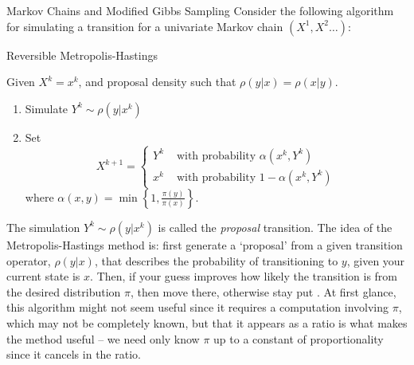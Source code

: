 \begin{chapter}{Markov Chains and Modified Gibbs Sampling}
Consider the following algorithm for simulating a transition for a univariate Markov chain $(X^1,X^2\dots)$:
\begin{algorithm}[H]
\caption{Reversible Metropolis-Hastings} \label{alg:metropolis}
Given $X^k = x^{k}$, and proposal density such that $\rho(y|x) = \rho(x|y)$.
\begin{enumerate}[1.]
  \item Simulate $Y^k \sim \rho(y|x^k)$
  \item Set
  \begin{equation*}
    X^{k+1} = \begin{cases}
      Y^k &\text{ with probability } \alpha(x^{k},Y^k) \\
      x^k &\text{ with probability } 1-\alpha(x^{k},Y^k)
    \end{cases} 
  \end{equation*}
  where $\displaystyle{\alpha(x,y) = \min\left\{1,\frac{\pi(y)}{\pi(x)}\right\}.}$ 
\end{enumerate}
\end{algorithm} 

The simulation $Y^k\sim \rho(y|x^k)$ is called the \emph{proposal} transition.
The idea of the Metropolis-Hastings method is: first generate a `proposal' from a given transition operator, $\rho(y|x)$, that describes the probability of transitioning to $y$, given your current state is $x$. 
Then, if your guess improves how likely the transition is from the desired distribution $\pi$, then move there, otherwise stay put \citep{calvetti2007introduction}.
At first glance, this algorithm might not seem useful since it requires a computation involving $\pi$, which may not be completely known, but that it appears as a ratio is what makes the method useful -- we need only know $\pi$ up to a constant of proportionality since it cancels in the ratio.


\end{chapter}
